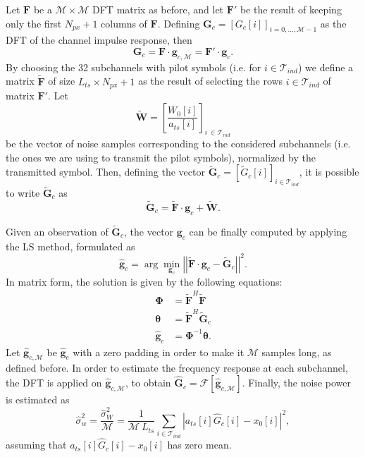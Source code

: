 \documentclass[10pt]{article}
\newcommand{\ofdM} {\mathcal{M}}
\newcommand{\DFTmat} {\mathbf{F}}
\newcommand{\DFTreduced} {\mathbf{\tilde{F}}}
\begin{document}
Let $\DFTmat$ be a $\ofdM \times \ofdM$ DFT matrix as before, and let $\DFTmat'$ be the result of keeping only the first $N_{px}+1$ columns of $\DFTmat$. Defining $\mathbf{G}_c = [ G_c[i] ]_{i = 0,\ldots,\ofdM-1}$ as the DFT of the channel impulse response, then
\begin{equation}
	\mathbf{G}_c = \DFTmat \cdot \mathbf{g}_{c,\ofdM} = \DFTmat' \cdot \mathbf{g}_c.
\end{equation}
By choosing the 32 subchannels with pilot symbols (i.e. for $ i \in \mathcal{T}_{ind}$) we define a matrix $\DFTreduced$ of size $L_{ts} \times N_{px} + 1$ as the result of selecting the rows $ i\in \mathcal{T}_{ind} $ of matrix $\DFTmat'$. Let 
\begin{equation}
	\mathbf{\tilde{W}} = \left[ \dfrac{W_0[i]}{a_{ts}[i]} \right] _{i\ \in \mathcal{T}_{ind}}
	\label{eq:ODFMnoisevarnormalized}
\end{equation}
be the vector of noise samples corresponding to the considered subchannels (i.e. the ones we are using to transmit the pilot symbols), normalized by the transmitted symbol. Then, defining the vector $\tilde{\mathbf{G}}_c = [ \tilde{G}_c[i] ]_{i\in \mathcal{T}_{ind}}$, it is possible to write $\mathbf{\tilde{G}}_c$ as
\begin{equation}
	\mathbf{\tilde{G}}_c = \DFTreduced \cdot \mathbf{g}_{c} + \mathbf{\tilde{W}}.
	\label{eq:OFDMfreqresp}
\end{equation}

Given an observation of $\tilde{\mathbf{G}}_c $, the vector $\mathbf{g}_{c}$ can be finally computed by applying the LS method, formulated as
\begin{equation}
	\mathbf{\hat{g}}_c = \arg\min_{\mathbf{g}_c} \left|\left|\DFTreduced \cdot \mathbf{g}_{c} - \tilde{\mathbf{G}}_c\right|\right|^2.
	\label{eq:OFDM_LS}
\end{equation}
In matrix form, the solution is given by the following equations:
\begin{align}
	\boldsymbol{\Phi} &= \DFTreduced^H \DFTreduced \\
	\boldsymbol{\theta} &= \DFTreduced^H \tilde{\mathbf{G}}_c \\ 
	\hat{\mathbf{g}}_{c} &= \boldsymbol{\Phi}^{-1} \boldsymbol{\theta}.
\end{align}
Let $\hat{\mathbf{g}}_{c, \ofdM}$ be $\hat{\mathbf{g}}_{c}$ with a zero padding in order to make it $\ofdM$ samples long, as defined before. In order to estimate the frequency response at each subchannel, the DFT is applied on $\hat{\mathbf{g}}_{c, \ofdM}$, to obtain $\mathbf{\hat{G}}_c = \mathcal{F}[\mathbf{\hat{g}}_{c, \ofdM}]$. 
Finally, the noise power is estimated as 
\begin{equation}
	\hat{\sigma}_w^2 = \frac{\hat{\sigma}_W^2}{\ofdM} = \frac{1}{\ofdM \: L_{ts}} \sum_{i \in \mathcal{T}_{ind}} \left| a_{ts}[i]\hat{G}_c[i] - x_0[i] \right| ^2,
\end{equation}
assuming that $a_{ts}[i]\hat{G}_c[i] \! - \! x_0[i]$ has zero mean.
\end{document}
